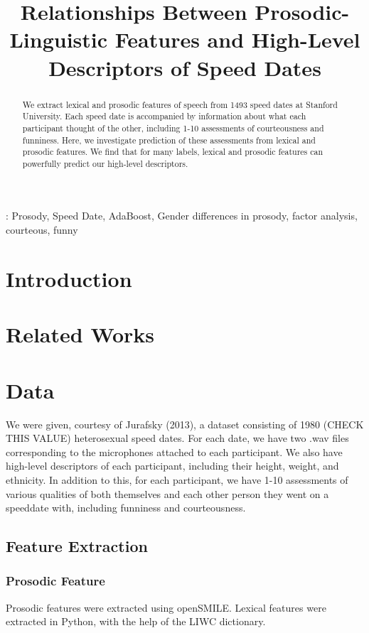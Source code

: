 \documentclass[a4paper]{article}
\title{Relationships Between Prosodic-Linguistic Features and High-Level Descriptors of Speed Dates}
\begin{document}
\maketitle
%

\begin{abstract}
We extract lexical and prosodic features of speech from 1493 speed dates at Stanford University.  Each speed date is accompanied by information about what each participant thought of the other, including 1-10 assessments of courteousness and funniness.  Here, we investigate prediction of these assessments from lexical and prosodic features.  We find that for many labels, lexical and prosodic features can powerfully predict our high-level descriptors.
\end{abstract}

: Prosody, Speed Date, AdaBoost, Gender differences in prosody, factor analysis, courteous, funny

%

\section{Introduction}

\section{Related Works}


\section{Data}
We were given, courtesy of Jurafsky (2013), a dataset consisting of 1980 (CHECK THIS VALUE) heterosexual speed dates. For each date, we have two .wav files corresponding to the microphones attached to each participant.  We also have high-level descriptors of each participant, including their height, weight, and ethnicity.  In addition to this, for each participant, we have 1-10 assessments of various qualities of both themselves and each other person they went on a speeddate with, including funniness and courteousness.

\subsection{Feature Extraction}

\subsubsection{Prosodic Feature}
Prosodic features were extracted using openSMILE.  Lexical features were extracted in Python, with the help of the LIWC dictionary.  
\end{document}
